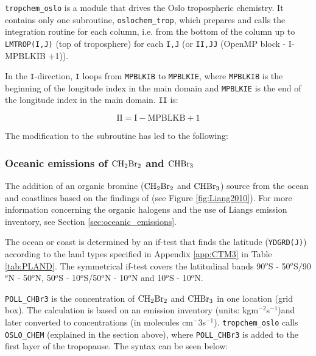 \texttt{tropchem\_oslo} is a module that drives the Oslo tropospheric chemistry. It contains only one subroutine, \texttt{oslochem\_trop}, which prepares and calls the integration routine for each column, i.e. from the bottom of the column up to \texttt{LMTROP(I,J)} (top of troposphere) for each \texttt{I,J} (or \texttt{II,JJ} (OpenMP block - I-MPBLKIB +1)). 

\medskip

In the \texttt{I}-direction, \texttt{I} loops from \texttt{MPBLKIB} to \texttt{MPBLKIE}, where \texttt{MPBLKIB} is the beginning of the longitude index in the main domain and \texttt{MPBLKIE} is the end of the longitude index in the main domain. \texttt{II} is: 

\begin{equation*}
    \text{II} = \text{I} - \text{MPBLKB} + 1
\end{equation*}

\medskip

The modification to the subroutine has led to the following: 


\subsubsection{Oceanic emissions of $\mathrm{CH_2Br_2}$ and $\mathrm{CHBr_3}$}\label{sec:impl_ocean_source}

The addition of an organic bromine ($\mathrm{CH_2Br_2}$ and $\mathrm{CHBr_3}$) source from the ocean and coastlines based on the findings of \cite{Liang2010} (see Figure \ref{fig:Liang2010}). For more information concerning the organic halogens and the use of Liangs emission inventory, see Section \ref{sec:oceanic_emissions}.

\medskip

The ocean or coast is determined by an if-test that finds the latitude (\texttt{YDGRD(J)}) according to the land types specified in Appendix \ref{app:CTM3} in Table \ref{tab:PLAND}. The symmetrical if-test covers the latitudinal bands 90$^o$S - 50$^o$S/90$^o$N - 50$^o$N, 50$^o$S - 10$^o$S/50$^o$N - 10$^o$N and 10$^o$S - 10$^o$N. 

\medskip

\texttt{POLL\_CHBr3} is the concentration of $\mathrm{CH_2Br_2}$ and $\mathrm{CHBr_3}$ in one location (grid box). The calculation is based on an emission inventory  (units: kgm$^{-2}$s$^{-1}$)and later converted to concentrations (in molecules cm$^-{3}$s$^{-1}$). \texttt{tropchem\_oslo} calls \texttt{OSLO\_CHEM} (explained in the section above), where \texttt{POLL\_CHBr3} is added to the first layer of the tropopause. The syntax can be seen below:


